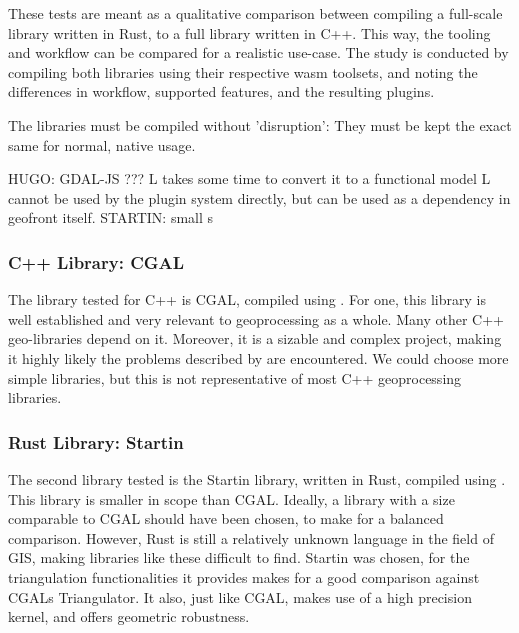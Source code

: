 These tests are meant as a qualitative comparison between compiling a full-scale library written in Rust, to a full library written in C++. 
This way, the tooling and workflow can be compared for a realistic use-case. 
The study is conducted by compiling both libraries using their respective \ac{wasm} toolsets, and noting the differences in workflow, supported features, and the resulting plugins. 

The libraries must be compiled without 'disruption': They must be kept the exact same for normal, native usage. 

\begin{note}
  HUGO: GDAL-JS ???
    L takes some time to convert it to a functional model
    L cannot be used by the plugin system directly, but can be used as a dependency in geofront itself.
  STARTIN: small s

\end{note}

\subsubsection{C++ Library: CGAL} 
The library tested for C++ is CGAL, compiled using . 
For one, this library is well established and very relevant to geoprocessing as a whole. 
Many other C++ geo-libraries depend on it.
Moreover, it is a sizable and complex project, making it highly likely the problems described by  are encountered. 
We could choose more simple libraries, but this is not representative of most C++ geoprocessing libraries. 

\subsubsection{Rust Library: Startin}
The second library tested is the Startin library, written in Rust, compiled using .  
This library is smaller in scope than CGAL. 
Ideally, a library with a size comparable to CGAL should have been chosen, to make for a balanced comparison. 
However, Rust is still a relatively unknown language in the field of GIS, making libraries like these difficult to find. 
Startin was chosen, for the triangulation functionalities it provides makes for a good comparison against CGALs Triangulator. 
It also, just like CGAL, makes use of a high precision kernel, and offers geometric robustness. 



